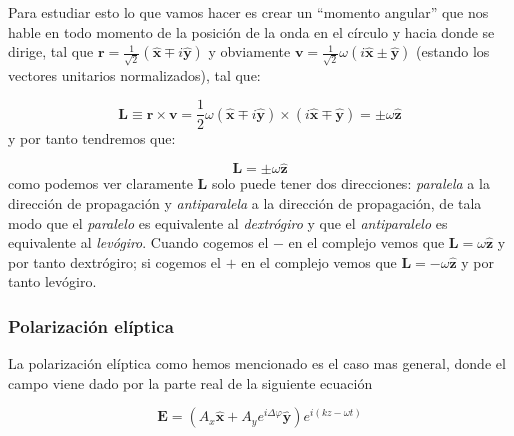 \documentclass[12pt]{article}
\newcommand{\En}{\mathbf{E}}
\newcommand{\vn}{\mathbf{v}}
\newcommand{\rn}{\mathbf{r}}
\newcommand{\Ln}{\mathbf{L}}
\newcommand{\hnz}{\hat{\mathbf{z}}}
\newcommand{\hnx}{\hat{\mathbf{x}}}
\newcommand{\hny}{\hat{\mathbf{y}}}
\numberwithin{equation}{section}
\numberwithin{figure}{section}
\begin{document}
Para estudiar esto lo que vamos hacer es crear un ``momento angular'' que nos hable en todo momento de la posición de la onda en el círculo y hacia donde se dirige, tal que $\rn =\frac{1}{\sqrt{2}} (\hnx \mp i \hny)$ y obviamente $\vn = \frac{1}{\sqrt{2}} \omega(i \hnx \pm \hny)$ (estando los vectores unitarios normalizados), tal que: 

$$ \Ln  \equiv \rn \times \vn = \frac{1}{2} \omega (\hnx \mp i \hny ) \times (i \hnx \mp \hny) = \pm \omega \hnz $$
y por tanto tendremos que:

\begin{equation}
\Ln = \pm \omega \hnz
\end{equation}
como podemos ver claramente $\Ln$ solo puede tener dos direcciones: \textit{paralela} a la dirección de propagación y \textit{antiparalela} a la dirección de propagación, de tala modo que el \textit{paralelo} es equivalente al \textit{dextrógiro} y que el \textit{antiparalelo} es equivalente al \textit{levógiro}. Cuando cogemos el $-$ en el complejo vemos que $\Ln = \omega \hnz$ y por tanto dextrógiro; si cogemos el $+$ en el complejo vemos que $\Ln = - \omega \hnz$ y por tanto levógiro.


\subsubsection{Polarización elíptica}

La polarización elíptica como hemos mencionado es el caso mas general, donde el campo viene dado por la parte real de la siguiente ecuación

\begin{equation}
\En = (A_x\hnx+A_y e^{i \Delta \varphi}\hny) e^{i (kz-\omega t)}
\end{equation}
\end{document}
